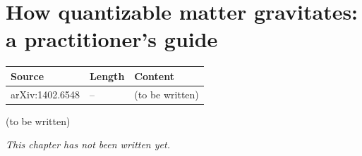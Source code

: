 \chapter{How quantizable matter gravitates: a practitioner's guide}\label{ch:c30}
\begin{paracol}{2}

\begin{sources}
\begin{tabularx}{\linewidth}{@{}l l L@{}}
\toprule
\textbf{Source} & \textbf{Length} & \textbf{Content}\\
\midrule
arXiv:1402.6548 & -- & (to be written)\\
\bottomrule
\end{tabularx}

\end{sources}

\begin{reading}
(to be written)
\end{reading}

\emph{This chapter has not been written yet.}

\flushside
\end{paracol}
